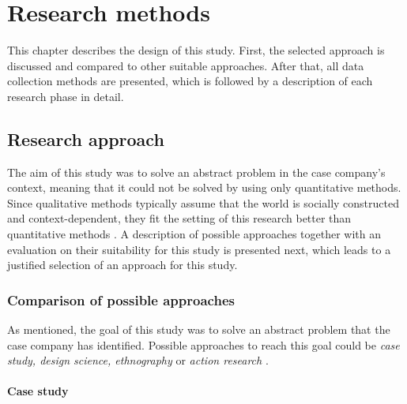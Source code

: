\chapter{Research methods}
\label{chapter:methods}

This chapter describes the design of this study. First, the selected approach is discussed and compared to other suitable approaches. After that, all data collection
methods are presented, which is followed by a description of each research phase in detail.

\section{Research approach}

The aim of this study was to solve an abstract
problem in the case company's context, meaning that it could not be solved by using only quantitative methods. Since qualitative methods typically assume that
the world is socially constructed and context-dependent, they fit the setting of this research better than quantitative methods \citep{Merriam2002}.
A description of possible approaches together with an evaluation on their suitability for this study is presented next, which leads to a justified selection of an approach for this study.

\subsection{Comparison of possible approaches}
As mentioned, the goal of this study was to solve an abstract problem that the case company has identified. Possible approaches to reach this goal could be
\emph{case study, design science, ethnography} or \emph{action research} \citep{Easterbrook2008}.

\subsubsection*{Case study}

